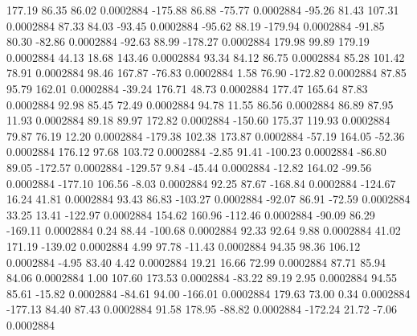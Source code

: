       177.19       86.35       86.02     0.0002884
     -175.88       86.88      -75.77     0.0002884
      -95.26       81.43      107.31     0.0002884
       87.33       84.03      -93.45     0.0002884
      -95.62       88.19     -179.94     0.0002884
      -91.85       80.30      -82.86     0.0002884
      -92.63       88.99     -178.27     0.0002884
      179.98       99.89      179.19     0.0002884
       44.13       18.68      143.46     0.0002884
       93.34       84.12       86.75     0.0002884
       85.28      101.42       78.91     0.0002884
       98.46      167.87      -76.83     0.0002884
        1.58       76.90     -172.82     0.0002884
       87.85       95.79      162.01     0.0002884
      -39.24      176.71       48.73     0.0002884
      177.47      165.64       87.83     0.0002884
       92.98       85.45       72.49     0.0002884
       94.78       11.55       86.56     0.0002884
       86.89       87.95       11.93     0.0002884
       89.18       89.97      172.82     0.0002884
     -150.60      175.37      119.93     0.0002884
       79.87       76.19       12.20     0.0002884
     -179.38      102.38      173.87     0.0002884
      -57.19      164.05      -52.36     0.0002884
      176.12       97.68      103.72     0.0002884
       -2.85       91.41     -100.23     0.0002884
      -86.80       89.05     -172.57     0.0002884
     -129.57        9.84      -45.44     0.0002884
      -12.82      164.02      -99.56     0.0002884
     -177.10      106.56       -8.03     0.0002884
       92.25       87.67     -168.84     0.0002884
     -124.67       16.24       41.81     0.0002884
       93.43       86.83     -103.27     0.0002884
      -92.07       86.91      -72.59     0.0002884
       33.25       13.41     -122.97     0.0002884
      154.62      160.96     -112.46     0.0002884
      -90.09       86.29     -169.11     0.0002884
        0.24       88.44     -100.68     0.0002884
       92.33       92.64        9.88     0.0002884
       41.02      171.19     -139.02     0.0002884
        4.99       97.78      -11.43     0.0002884
       94.35       98.36      106.12     0.0002884
       -4.95       83.40        4.42     0.0002884
       19.21       16.66       72.99     0.0002884
       87.71       85.94       84.06     0.0002884
        1.00      107.60      173.53     0.0002884
      -83.22       89.19        2.95     0.0002884
       94.55       85.61      -15.82     0.0002884
      -84.61       94.00     -166.01     0.0002884
      179.63       73.00        0.34     0.0002884
     -177.13       84.40       87.43     0.0002884
       91.58      178.95      -88.82     0.0002884
     -172.24       21.72       -7.06     0.0002884

